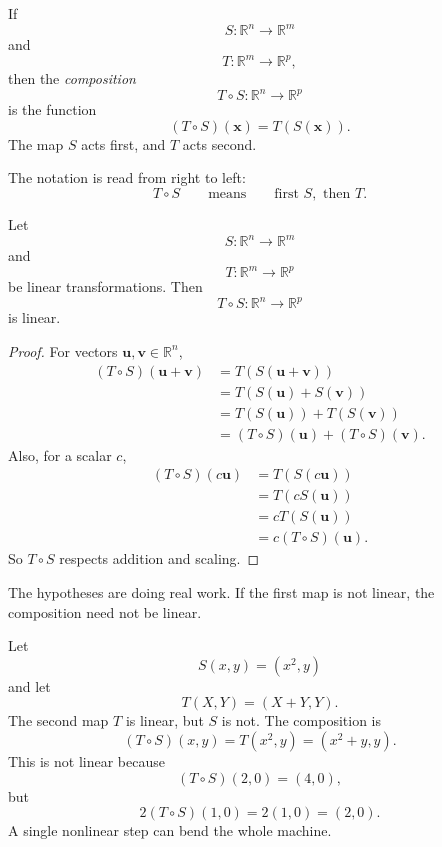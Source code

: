 \begin{definition}[Composition]
If
\[
    S:\mathbb R^n\to\mathbb R^m
\]
and
\[
    T:\mathbb R^m\to\mathbb R^p,
\]
then the \emph{composition}
\[
    T\circ S:\mathbb R^n\to\mathbb R^p
\]
is the function
\[
    (T\circ S)(\mathbf x)=T(S(\mathbf x)).
\]
The map \(S\) acts first, and \(T\) acts second.
\end{definition}

The notation is read from right to left:
\[
    T\circ S
    \qquad
    \text{means}
    \qquad
    \text{first }S,\text{ then }T.
\]

\begin{theorem}
Let
\[
    S:\mathbb R^n\to\mathbb R^m
\]
and
\[
    T:\mathbb R^m\to\mathbb R^p
\]
be linear transformations.  Then
\[
    T\circ S:\mathbb R^n\to\mathbb R^p
\]
is linear.
\end{theorem}

\begin{proof}
For vectors \(\mathbf u,\mathbf v\in\mathbb R^n\),
\[
\begin{aligned}
(T\circ S)(\mathbf u+\mathbf v)
&=
T(S(\mathbf u+\mathbf v))\\
&=
T(S(\mathbf u)+S(\mathbf v))\\
&=
T(S(\mathbf u))+T(S(\mathbf v))\\
&=
(T\circ S)(\mathbf u)+(T\circ S)(\mathbf v).
\end{aligned}
\]
Also, for a scalar \(c\),
\[
\begin{aligned}
(T\circ S)(c\mathbf u)
&=
T(S(c\mathbf u))\\
&=
T(cS(\mathbf u))\\
&=
cT(S(\mathbf u))\\
&=
c(T\circ S)(\mathbf u).
\end{aligned}
\]
So \(T\circ S\) respects addition and scaling.
\end{proof}

The hypotheses are doing real work.  If the first map is not linear, the composition need
not be linear.

\begin{example}
Let
\[
    S(x,y)=(x^2,y)
\]
and let
\[
    T(X,Y)=(X+Y,Y).
\]
The second map \(T\) is linear, but \(S\) is not.  The composition is
\[
    (T\circ S)(x,y)=T(x^2,y)=(x^2+y,y).
\]
This is not linear because
\[
    (T\circ S)(2,0)=(4,0),
\]
but
\[
    2(T\circ S)(1,0)=2(1,0)=(2,0).
\]
A single nonlinear step can bend the whole machine.
\end{example}

